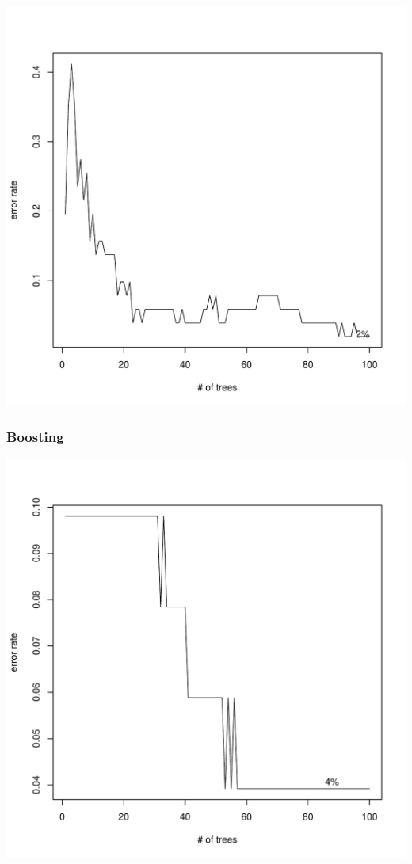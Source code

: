 \begin{frame}[fragile]

\centering
\includegraphics[scale=.45]{images/Figure_5}

\end{frame}
\begin{frame}[fragile]\frametitle{Boosting}

\centering
\includegraphics[scale=.45]{images/Figure_6}

\end{frame}

